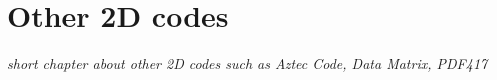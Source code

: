 \chapter{Other 2D codes}
\label{chap:other_2d}

\emph{short chapter about other 2D codes such as Aztec Code, Data Matrix, PDF417}
